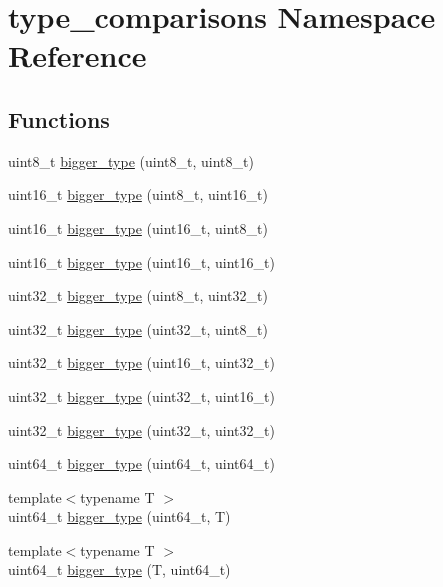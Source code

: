\hypertarget{namespacetype__comparisons}{}\section{type\+\_\+comparisons Namespace Reference}
\label{namespacetype__comparisons}
\subsection*{Functions}
\begin{DoxyCompactItemize}
\item 
uint8\+\_\+t \hyperlink{namespacetype__comparisons_a864255d8954d6a50a5ca3881b6ac8525}{bigger\+\_\+type} (uint8\+\_\+t, uint8\+\_\+t)
\item 
uint16\+\_\+t \hyperlink{namespacetype__comparisons_a4abbfdbb21f2c59853a4d979138e43ec}{bigger\+\_\+type} (uint8\+\_\+t, uint16\+\_\+t)
\item 
uint16\+\_\+t \hyperlink{namespacetype__comparisons_abd3e8fa263291a3599efd53b16e97dfd}{bigger\+\_\+type} (uint16\+\_\+t, uint8\+\_\+t)
\item 
uint16\+\_\+t \hyperlink{namespacetype__comparisons_a36864af2f41734358e94eacff08459d6}{bigger\+\_\+type} (uint16\+\_\+t, uint16\+\_\+t)
\item 
uint32\+\_\+t \hyperlink{namespacetype__comparisons_a07cf30f82c4f24e069f597ba0f2da5f1}{bigger\+\_\+type} (uint8\+\_\+t, uint32\+\_\+t)
\item 
uint32\+\_\+t \hyperlink{namespacetype__comparisons_aa17f8395127e8110467de705e5c9424a}{bigger\+\_\+type} (uint32\+\_\+t, uint8\+\_\+t)
\item 
uint32\+\_\+t \hyperlink{namespacetype__comparisons_a228f7b0727f18f638ed3a4da3eee2651}{bigger\+\_\+type} (uint16\+\_\+t, uint32\+\_\+t)
\item 
uint32\+\_\+t \hyperlink{namespacetype__comparisons_ac4490018d4c7e3eeba1e400367b2b96a}{bigger\+\_\+type} (uint32\+\_\+t, uint16\+\_\+t)
\item 
uint32\+\_\+t \hyperlink{namespacetype__comparisons_a6691cf9e4c6d55e3a37c12ace5f1e124}{bigger\+\_\+type} (uint32\+\_\+t, uint32\+\_\+t)
\item 
uint64\+\_\+t \hyperlink{namespacetype__comparisons_a32fdd7e341dd5b5736450f4af91b696b}{bigger\+\_\+type} (uint64\+\_\+t, uint64\+\_\+t)
\item 
{\footnotesize template$<$typename T $>$ }\\uint64\+\_\+t \hyperlink{namespacetype__comparisons_ae546a6ad39ebc6f7f63dd4a211ac76b6}{bigger\+\_\+type} (uint64\+\_\+t, T)
\item 
{\footnotesize template$<$typename T $>$ }\\uint64\+\_\+t \hyperlink{namespacetype__comparisons_adef2fefbc448ca4035cb44acbd8aaa8a}{bigger\+\_\+type} (T, uint64\+\_\+t)
\end{DoxyCompactItemize}


